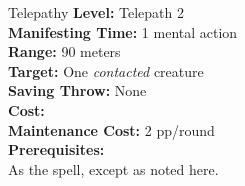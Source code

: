 {Telepathy}
{
    \textbf{Level:}
    Telepath 2\\
    \textbf{Manifesting Time:}
    1 mental action\\
    \textbf{Range:}
    90 meters\\
    \textbf{Target:}
    One \emph{contacted} creature\\
    \textbf{Saving Throw:}
    None\\
    \textbf{Cost:}
    \\
    \textbf{Maintenance Cost:}
    2 pp/round\\
    \textbf{Prerequisites:}
    \\
}
{
    As the  spell, except as noted here.
}
